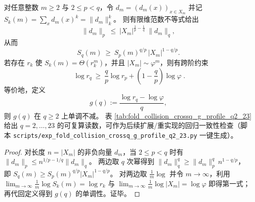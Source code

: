 \begin{proposition}\label{prop:pom-crossq-g-monotone}
对任意整数 \(m\ge 2\) 与 \(2\le p<q\)，令 \(d_m=(d_m(x))_{x\in X_m}\) 并记 \(S_k(m)=\sum_x d_m(x)^k=\|d_m\|_k^k\)。
则有限维范数不等式给出
\[
\|d_m\|_p\ \le\ |X_m|^{\frac{1}{p}-\frac{1}{q}}\ \|d_m\|_q,
\]
从而
\[
S_q(m)\ \ge\ S_p(m)^{q/p}\,|X_m|^{1-q/p}.
\]
若存在 \(r_k\) 使 \(S_k(m)=\Theta(r_k^m)\)，并且 \(|X_m|\sim \varphi^m\)，则有跨阶约束
\[
\boxed{\;
\log r_q \ \ge\ \frac{q}{p}\log r_p + \left(1-\frac{q}{p}\right)\log\varphi\; }.
\]
等价地，定义
\[
g(q):=\frac{\log r_q-\log\varphi}{q},
\]
则 \(g(q)\) 在 \(q\ge 2\) 上单调不减。
表 \ref{tab:fold_collision_crossq_g_profile_q2_23} 给出 \(q=2,\dots,23\) 的可复算读数，可作为后续扩展/重实现的回归一致性检查（脚本 \texttt{scripts/exp\_fold\_collision\_crossq\_g\_profile\_q2\_23.py} 一键生成）。
\end{proposition}
\begin{proof}
对长度 \(n=|X_m|\) 的非负向量 \(d_m\)，当 \(2\le p<q\) 时有 \(\|d_m\|_p\le n^{1/p-1/q}\|d_m\|_q\)。
两边取 \(q\) 次幂得到
\(
\|d_m\|_q^q \ge \|d_m\|_p^q\,n^{1-q/p}
\)，
即
\(
S_q(m)\ge S_p(m)^{q/p}|X_m|^{1-q/p}
\)。
对两边取 \(\frac{1}{m}\log\) 并令 \(m\to\infty\)，利用
\(
\lim_{m\to\infty}\frac{1}{m}\log S_k(m)=\log r_k
\)
与
\(
\lim_{m\to\infty}\frac{1}{m}\log|X_m|=\log\varphi
\)
即得第一式；再代回定义得到 \(g(q)\) 的单调性。证毕。
\end{proof}



